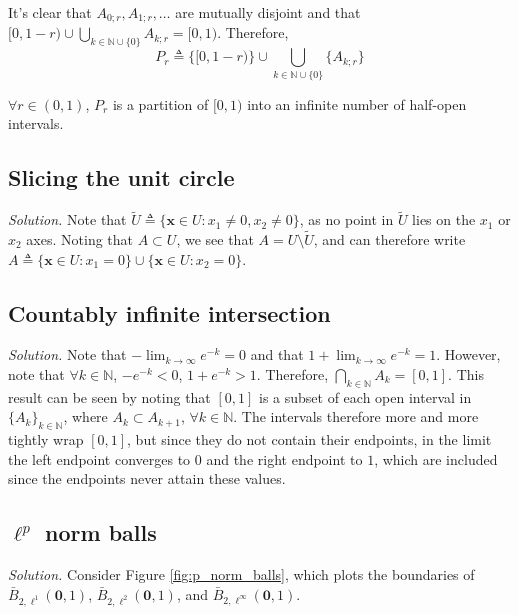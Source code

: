 \documentclass{article}
\numberwithin{equation}{section}
\begin{document}
It's clear that $ A_{0; r}, A_{1; r}, \ldots $ are mutually disjoint and that
$ [0, 1 - r) \cup \bigcup_{k \in \mathbb{N} \cup\{0\}}A_{k; r} = [0, 1) $.
Therefore,
\begin{equation*}
    P_r \triangleq \{[0, 1 - r)\} \cup
    \bigcup_{k \in \mathbb{N}\cup\{0\}}\{A_{k; r}\}
\end{equation*}

$ \forall r \in (0, 1) $, $ P_r $ is a partition of $ [0, 1) $ into an
infinite number of half-open intervals.

\subsection{Slicing the unit circle}

\textit{Solution.} Note that $ \tilde{U} \triangleq \{\mathbf{x} \in U :
x_1 \ne 0, x_2 \ne 0\} $, as no point in $ \tilde{U} $ lies on the $ x_1 $ or
$ x_2 $ axes. Noting that $ A \subset U $, we see that $ A = U \setminus
\tilde{U} $, and can therefore write $ A \triangleq
\{\mathbf{x} \in U : x_1 = 0\} \cup \{\mathbf{x} \in U : x_2 = 0\} $.

\subsection{Countably infinite intersection}

\textit{Solution.} Note that $ -\lim_{k \rightarrow \infty}e^{-k} = 0 $ and
that $ 1 + \lim_{k \rightarrow \infty}e^{-k} = 1 $. However, note that
$ \forall k \in \mathbb{N} $, $ -e^{-k} < 0 $, $ 1 + e^{-k} > 1 $. Therefore,
$ \bigcap_{k \in \mathbb{N}}A_k = [0, 1] $. This result can be seen by
noting that $ [0, 1] $ is a subset of each open interval in
$ \{A_k\}_{k \in \mathbb{N}} $, where $ A_k \subset A_{k + 1} $,
$ \forall k \in \mathbb{N} $. The intervals therefore more and more tightly
wrap $ [0, 1] $, but since they do not contain their endpoints, in the limit
the left endpoint converges to $ 0 $ and the right endpoint to $ 1 $, which
are included since the endpoints never attain these values.

\subsection{$ \ell^p $ norm balls}

\textit{Solution.} Consider Figure \ref{fig:p_norm_balls}, which plots the
boundaries of $ \bar{B}_{2, \ell^1}(\mathbf{0}, 1) $,
$ \bar{B}_{2, \ell^2}(\mathbf{0}, 1) $, and
$ \bar{B}_{2, \ell^\infty}(\mathbf{0}, 1) $.
\end{document}
